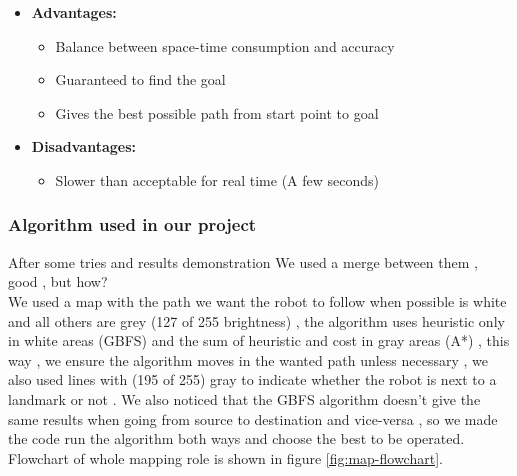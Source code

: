 \documentclass[12pt]{article}
\begin{document}
\begin{itemize}
	\item \textbf{Advantages:}
	\begin{itemize}
		\item Balance between space-time consumption and accuracy
		\item Guaranteed to find the goal
		\item Gives the best possible path from start point to goal
		
		
	\end{itemize}
	\item \textbf{Disadvantages:}
	\begin{itemize}
		\item Slower than acceptable for real time (A few seconds)
		
	\end{itemize}
\end{itemize}

\subsubsection{Algorithm used in our project}
After some tries and results demonstration We used a merge between them , good , but how?\\
We used a map with the path we want the robot to follow when possible is white and all others are grey (127 of 255 brightness) , the algorithm uses heuristic only in white areas (GBFS) and the sum of heuristic and cost in gray areas (A*) , this way , we ensure the algorithm moves in the wanted path unless necessary , we also used lines with (195 of 255) gray to indicate whether the robot is next to a landmark or not .
We also noticed that the GBFS algorithm doesn’t give the same results when going from source to destination and vice-versa , so we made the code run the algorithm both ways and choose the best to be operated.
Flowchart of whole mapping role is shown in figure \ref{fig:map-flowchart}.
\end{document}
